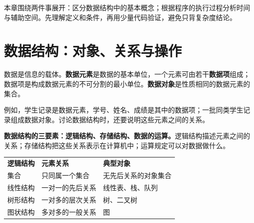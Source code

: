\hypertarget{ds1-intro}{}

本章围绕两件事展开：区分数据结构中的基本概念；根据程序的执行过程分析时间与辅助空间。先理解定义和条件，再用少量代码验证，避免只背复杂度结论。


\hypertarget{ds1-concepts}{}

\section{数据结构：对象、关系与操作}\label{ds1-concepts}

\hypertarget{ds1-terms}{}

\begin{definition}[数据元素与数据项]
数据是信息的载体。\textbf{数据元素}是数据的基本单位，一个元素可由若干\textbf{数据项}组成；数据项是构成数据元素的不可分割的最小单位。\textbf{数据对象}是性质相同的数据元素的集合。
\end{definition}

\hypertarget{ds1-record}{}

例如，学生记录是数据元素，学号、姓名、成绩是其中的数据项；一批同类学生记录组成数据对象。讨论数据结构时，还要说明这些元素之间的关系。


\hypertarget{ds1-three}{}

\begin{takeaway}[三要素]
\textbf{数据结构的三要素：逻辑结构、存储结构、数据的运算。}逻辑结构描述元素之间的关系；存储结构把这些关系表示在计算机中；运算规定可以对数据做什么。
\end{takeaway}

\hypertarget{ds1-value-relation}{}


\hypertarget{ds1-logical}{}

\par\smallskip\noindent\begin{tabularx}{\linewidth}{@{}YYY@{}}\toprule
{} \textbf{逻辑结构} & \textbf{元素关系} & \textbf{典型对象} \\
集合 & 只同属一个集合 & 无先后关系的对象集合 \\
线性结构 & 一对一的先后关系 & 线性表、栈、队列 \\
树形结构 & 一对多的层次关系 & 树、二叉树 \\
图状结构 & 多对多的一般关系 & 图 \\\bottomrule\end{tabularx}\par\smallskip

